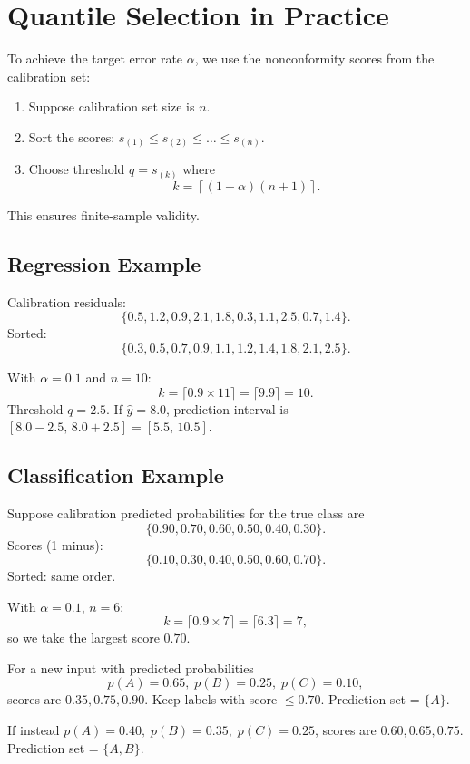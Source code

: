 \documentclass[11pt]{article}
\theoremstyle{remark}
\begin{document}
\section{Quantile Selection in Practice}
To achieve the target error rate $\alpha$, we use the nonconformity scores from the calibration set:
\begin{enumerate}
    \item Suppose calibration set size is $n$.
    \item Sort the scores: $s_{(1)} \leq s_{(2)} \leq \dots \leq s_{(n)}$.
    \item Choose threshold $q = s_{(k)}$ where
    \[
    k = \left\lceil (1-\alpha)(n+1) \right\rceil.
    \]
\end{enumerate}

This ensures finite-sample validity.

\subsection*{Regression Example}
Calibration residuals:
\[
\{0.5, 1.2, 0.9, 2.1, 1.8, 0.3, 1.1, 2.5, 0.7, 1.4\}.
\]
Sorted:
\[
\{0.3, 0.5, 0.7, 0.9, 1.1, 1.2, 1.4, 1.8, 2.1, 2.5\}.
\]

With $\alpha = 0.1$ and $n=10$:
\[
k = \lceil 0.9 \times 11 \rceil = \lceil 9.9 \rceil = 10.
\]
Threshold $q=2.5$.
If $\hat{y}=8.0$, prediction interval is $[8.0-2.5,\,8.0+2.5]=[5.5,\,10.5]$.

\subsection*{Classification Example}
Suppose calibration predicted probabilities for the true class are
\[
\{0.90, 0.70, 0.60, 0.50, 0.40, 0.30\}.
\]
Scores (1 minus):
\[
\{0.10, 0.30, 0.40, 0.50, 0.60, 0.70\}.
\]
Sorted: same order.

With $\alpha=0.1$, $n=6$:
\[
k = \lceil 0.9 \times 7 \rceil = \lceil 6.3 \rceil = 7,
\]
so we take the largest score $0.70$.

For a new input with predicted probabilities
\[
p(A)=0.65,\; p(B)=0.25,\; p(C)=0.10,
\]
scores are $0.35, 0.75, 0.90$.
Keep labels with score $\leq 0.70$. Prediction set = $\{A\}$.

\bigskip
If instead $p(A)=0.40,\; p(B)=0.35,\; p(C)=0.25$,
scores are $0.60, 0.65, 0.75$.
Prediction set = $\{A,B\}$.
\end{document}
